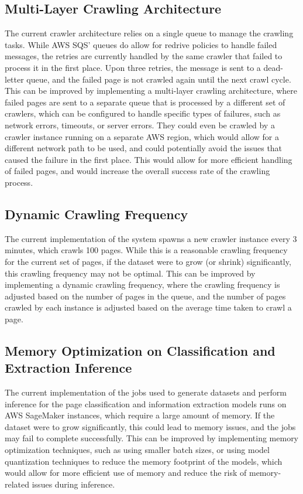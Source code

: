\subsection{Multi-Layer Crawling Architecture}\label{subsec:multi-layer-crawling-architecture}
The current crawler architecture relies on a single queue to manage the crawling tasks.
While AWS SQS' queues do allow for redrive policies to handle failed messages, the retries are currently handled by the same crawler that failed to process it in the first place.
Upon three retries, the message is sent to a dead-letter queue, and the failed page is not crawled again until the next crawl cycle.
This can be improved by implementing a multi-layer crawling architecture, where failed pages are sent to a separate queue that is processed by a different set of crawlers, which can be configured to handle specific types of failures, such as network errors, timeouts, or server errors.
They could even be crawled by a crawler instance running on a separate AWS region, which would allow for a different network path to be used, and could potentially avoid the issues that caused the failure in the first place.
This would allow for more efficient handling of failed pages, and would increase the overall success rate of the crawling process.

\subsection{Dynamic Crawling Frequency}\label{subsec:dynamic-crawling-frequency}
The current implementation of the system spawns a new crawler instance every 3 minutes, which crawls 100 pages.
While this is a reasonable crawling frequency for the current set of pages, if the dataset were to grow (or shrink) significantly, this crawling frequency may not be optimal.
This can be improved by implementing a dynamic crawling frequency, where the crawling frequency is adjusted based on the number of pages in the queue, and the number of pages crawled by each instance is adjusted based on the average time taken to crawl a page.

\subsection{Memory Optimization on Classification and Extraction Inference}\label{subsec:memory-optimization-on-classification-and-extraction-inference}
The current implementation of the jobs used to generate datasets and perform inference for the page classification and information extraction models runs on AWS SageMaker instances, which require a large amount of memory.
If the dataset were to grow significantly, this could lead to memory issues, and the jobs may fail to complete successfully.
This can be improved by implementing memory optimization techniques, such as using smaller batch sizes, or using model quantization techniques to reduce the memory footprint of the models, which would allow for more efficient use of memory and reduce the risk of memory-related issues during inference.


